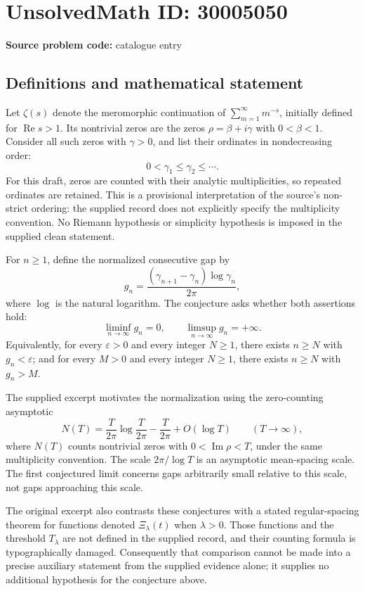 \documentclass[11pt]{article}
\begin{document}
\section*{UnsolvedMath ID: 30005050}
\textbf{Source problem code:} catalogue entry
\subsection{Definitions and mathematical statement}
Let \(\zeta(s)\) denote the meromorphic continuation of \(\sum_{m=1}^{\infty}m^{-s}\), initially defined for \(\operatorname{Re}s>1\). Its nontrivial zeros are the zeros \(\rho=\beta+i\gamma\) with \(0<\beta<1\). Consider all such zeros with \(\gamma>0\), and list their ordinates in nondecreasing order:
\[
0<\gamma_1\leq\gamma_2\leq\cdots.
\]
For this draft, zeros are counted with their analytic multiplicities, so repeated ordinates are retained. This is a provisional interpretation of the source's non-strict ordering: the supplied record does not explicitly specify the multiplicity convention. No Riemann hypothesis or simplicity hypothesis is imposed in the supplied clean statement.

For \(n\geq1\), define the normalized consecutive gap by
\[
g_n=\frac{(\gamma_{n+1}-\gamma_n)\log\gamma_n}{2\pi},
\]
where \(\log\) is the natural logarithm. The conjecture asks whether both assertions hold:
\[
\liminf_{n\to\infty}g_n=0,
\qquad
\limsup_{n\to\infty}g_n=+\infty.
\]
Equivalently, for every \(\varepsilon>0\) and every integer \(N\geq1\), there exists \(n\geq N\) with \(g_n<\varepsilon\); and for every \(M>0\) and every integer \(N\geq1\), there exists \(n\geq N\) with \(g_n>M\).

The supplied excerpt motivates the normalization using the zero-counting asymptotic
\[
N(T)=\frac{T}{2\pi}\log\frac{T}{2\pi}-\frac{T}{2\pi}+O(\log T)
\qquad(T\to\infty),
\]
where \(N(T)\) counts nontrivial zeros with \(0<\operatorname{Im}\rho<T\), under the same multiplicity convention. The scale \(2\pi/\log T\) is an asymptotic mean-spacing scale. The first conjectured limit concerns gaps arbitrarily small relative to this scale, not gaps approaching this scale.

The original excerpt also contrasts these conjectures with a stated regular-spacing theorem for functions denoted \(\Xi_\lambda(t)\) when \(\lambda>0\). Those functions and the threshold \(T_\lambda\) are not defined in the supplied record, and their counting formula is typographically damaged. Consequently that comparison cannot be made into a precise auxiliary statement from the supplied evidence alone; it supplies no additional hypothesis for the conjecture above.
\end{document}
